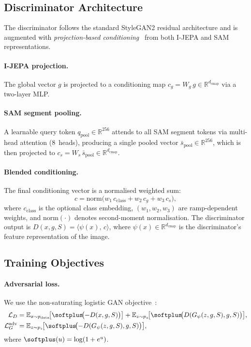 \documentclass[12pt]{article}
\begin{document}
\subsection{Discriminator Architecture}

The discriminator follows the standard StyleGAN2 residual architecture
and is augmented with \emph{projection-based conditioning}~\cite{miyato2018projection}
from both I-JEPA and SAM representations.

\paragraph{I-JEPA projection.}
The global vector $g$ is projected to a conditioning map
$c_g = W_g\, g \in \mathbb{R}^{d_{\mathrm{cmap}}}$ via a
two-layer MLP.

\paragraph{SAM segment pooling.}
A learnable query token $q_{\mathrm{pool}} \in \mathbb{R}^{256}$
attends to all SAM segment tokens via multi-head attention
(8~heads), producing a single pooled vector
$\bar{s}_{\mathrm{pool}} \in \mathbb{R}^{256}$, which is then projected
to $c_s = W_s\, \bar{s}_{\mathrm{pool}} \in \mathbb{R}^{d_{\mathrm{cmap}}}$.

\paragraph{Blended conditioning.}
The final conditioning vector is a normalised weighted sum:
\begin{equation}\label{eq:d-cmap}
    c = \mathrm{norm}\!\bigl(w_1\, c_{\mathrm{class}} + w_2\, c_g + w_3\, c_s\bigr),
\end{equation}
where $c_{\mathrm{class}}$ is the optional class embedding,
$(w_1, w_2, w_3)$ are ramp-dependent weights,
and $\mathrm{norm}(\cdot)$ denotes second-moment normalisation.
The discriminator output is
$D(x, g, S) = \langle \psi(x),\, c \rangle$,
where $\psi(x) \in \mathbb{R}^{d_{\mathrm{cmap}}}$ is the
discriminator's feature representation of the image.

\subsection{Training Objectives}
\label{sec:stage2-losses}

\paragraph{Adversarial loss.}
We use the non-saturating logistic GAN objective~\cite{goodfellow2014gan}:
\begin{align}
    \mathcal{L}_D &= \mathbb{E}_{x \sim p_{\mathrm{data}}}\!
    \bigl[\softplus\!\bigl(-D(x, g, S)\bigr)\bigr]
    + \mathbb{E}_{z \sim p_z}\!
    \bigl[\softplus\!\bigl(D(G_\psi(z, g, S), g, S)\bigr)\bigr],
    \label{eq:d-loss} \\
    \mathcal{L}_G^{\mathrm{adv}} &= \mathbb{E}_{z \sim p_z}\!
    \bigl[\softplus\!\bigl(-D(G_\psi(z, g, S), g, S)\bigr)\bigr],
    \label{eq:g-adv-loss}
\end{align}
where $\softplus(u) = \log(1 + e^u)$.
\end{document}
